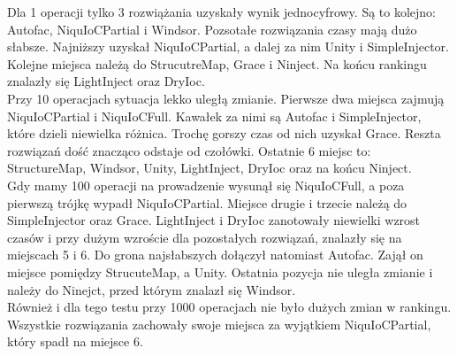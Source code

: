 \documentclass[12pt]{article}
\begin{document}
Dla 1 operacji tylko 3 rozwiążania uzyskały wynik jednocyfrowy. Są to kolejno: Autofac, NiquIoCPartial i Windsor. Pozsotałe rozwiązania czasy mają dużo słabsze. Najniższy uzyskał NiquIoCPartial, a dalej za nim Unity i SimpleInjector. Kolejne miejsca należą do StrucutreMap, Grace i Ninject. Na końcu rankingu znalazły się LightInject oraz DryIoc.\\
Przy 10 operacjach sytuacja lekko uległą zmianie. Pierwsze dwa miejsca zajmują NiquIoCPartial i NiquIoCFull. Kawałek za nimi są Autofac i SimpleInjector, które dzieli niewielka różnica. Trochę gorszy czas od nich uzyskał Grace. Reszta rozwiązań dość znacząco odstaje od czołówki. Ostatnie 6 miejsc to: StructureMap, Windsor, Unity, LightInject, DryIoc oraz na końcu Ninject.\\
Gdy mamy 100 operacji na prowadzenie wysunął się NiquIoCFull, a poza pierwszą trójkę wypadł NiquIoCPartial. Miejsce drugie i trzecie należą do SimpleInjector oraz Grace. LightInject i DryIoc zanotowały niewielki wzrost czasów i przy dużym wzroście dla pozostałych rozwiązań, znalazły się na miejscach 5 i 6. Do grona najsłabszych dołączył natomiast Autofac. Zajął on miejsce pomiędzy StrucuteMap, a Unity. Ostatnia pozycja nie uległa zmianie i należy do Ninejct, przed którym znalazł się Windsor.\\
Również i dla tego testu przy 1000 operacjach nie było dużych zmian w rankingu. Wszystkie rozwiązania zachowały swoje miejsca za wyjątkiem NiquIoCPartial, który spadł na miejsce 6.
\end{document}
